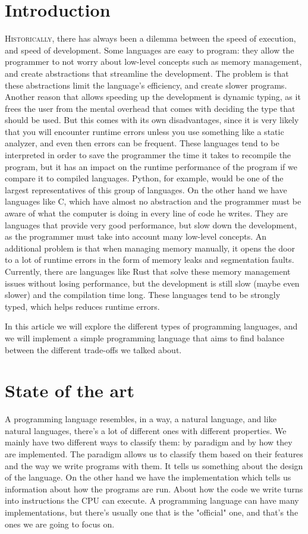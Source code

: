 ﻿\documentclass[10pt,a4paper,twocolumn,twoside]{article}
\begin{document}
\section{Introduction} \lettrine[lines=3]{H}{istorically}, there has always been
a dilemma between the speed of execution, and speed of development. Some
languages are easy to program: they allow the programmer to not worry about
low-level concepts such as memory management, and create abstractions that
streamline the development. The problem is that these abstractions limit the
language's efficiency, and create slower programs. Another reason that allows
speeding up the development is dynamic typing, as it frees the user from the
mental overhead that comes with deciding the type that should be used. But this
comes with its own disadvantages, since it is very likely that you will
encounter runtime errors unless you use something like a static analyzer, and
even then errors can be frequent. These languages tend to be interpreted in
order to save the programmer the time it takes to recompile the program, but it
has an impact on the runtime performance of the program if we compare it to
compiled languages. Python, for example, would be one of the largest
representatives of this group of languages. On the other hand we have languages
like C, which have almost no abstraction and the programmer must be aware of
what the computer is doing in every line of code he writes. They are languages
that provide very good performance, but slow down the development, as the
programmer must take into account many low-level concepts. An additional problem
is that when managing memory manually, it opens the door to a lot of runtime
errors in the form of memory leaks and segmentation faults. Currently, there are
languages like Rust that solve these memory management issues without losing
performance, but the development is still slow (maybe even slower) and the
compilation time long. These languages tend to be strongly typed, which helps
reduces runtime errors.

In this article we will explore the different types of programming languages,
and we will implement a simple programming language that aims to find balance
between the different trade-offs we talked about.

\section{State of the art}
A programming language resembles, in a way, a natural language, and like natural
languages, there's a lot of different ones with different properties. We mainly
have two different ways to classify them: by paradigm and by how they are
implemented. The paradigm allows us to classify them based on their features and
the way we write programs with them. It tells us something about the design of
the language. On the other hand we have the implementation which tells us
information about how the programs are run. About how the code we write turns
into instructions the CPU can execute. A programming language can have many
implementations, but there's usually one that is the "official" one, and that's
the ones we are going to focus on.
\end{document}

